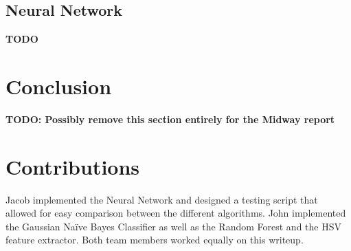 \documentclass{article} %
\begin{document}
\subsection*{Neural Network}

\textbf{TODO}

\section{Conclusion}

\textbf{TODO: Possibly remove this section entirely for the Midway report}


\section{Contributions}

Jacob implemented the Neural Network and designed a testing script that allowed for easy comparison between the different algorithms. John implemented the Gaussian Na\"ive Bayes Classifier as well as the Random Forest and the HSV feature extractor. Both team members worked equally on this writeup.
\end{document}
